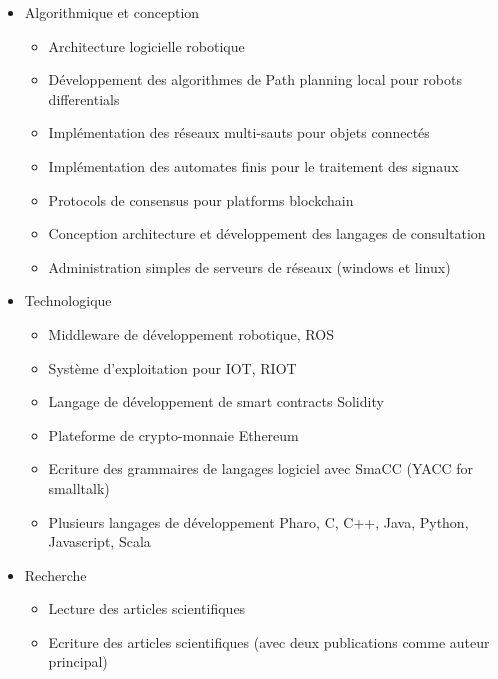\documentclass{resume} %
\begin{document}
	\begin{itemize} 				
			\item Algorithmique et conception 
					\begin{itemize}
						\item Architecture logicielle robotique 
						\item Développement des algorithmes de Path planning local pour robots differentials 
						\item Implémentation des réseaux  multi-sauts pour objets connectés 
						\item Implémentation des automates finis pour le traitement des signaux
						\item Protocols de consensus pour platforms blockchain 
						\item Conception architecture et développement des langages de consultation 
						\item Administration simples de serveurs de réseaux (windows et linux)
					\end {itemize}
			\item Technologique
					\begin{itemize}
						\item Middleware de développement robotique, ROS 
						\item Système d'exploitation pour IOT, RIOT 
						\item Langage de développement de smart contracts Solidity 
						\item Plateforme de crypto-monnaie Ethereum
						\item Ecriture des grammaires de langages logiciel avec SmaCC (YACC for smalltalk) 
						\item Plusieurs langages de développement Pharo, C, C++, Java, Python, Javascript, Scala
					\end {itemize}
			\item  Recherche 
				\begin{itemize}
						\item Lecture des articles scientifiques 
						\item Ecriture des articles scientifiques (avec deux publications comme auteur principal) 
				\end {itemize}
		\end{itemize}
		


		
\end{document}
